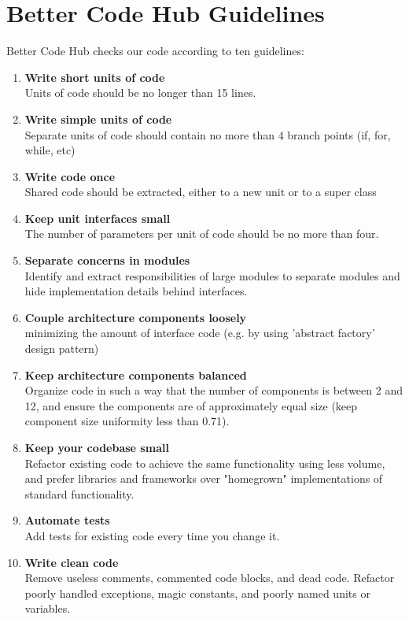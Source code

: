 \section{Better Code Hub Guidelines}\label{bch_guidelines}

Better Code Hub \cite{better_code_hub} checks our code according to ten guidelines:
\begin{enumerate}
    \item \textbf {Write short units of code} \\
    Units of code should be no longer than 15 lines.
    \item \textbf {Write simple units of code} \\
    Separate units of code should contain no more than 4 branch points (if, for, while, etc)
    \item \textbf{Write code once} \\
    Shared code should be extracted, either to a new unit or to a super class
    \item \textbf{Keep unit interfaces small} \\
    The number of parameters per unit of code should be no more than four.
    \item \textbf{Separate concerns in modules} \\
    Identify and extract responsibilities of large modules to separate modules and hide implementation details behind interfaces.
    \item \textbf{Couple architecture components loosely} \\
    minimizing the amount of interface code (e.g. by using 'abstract factory' design pattern)
    \item \textbf{Keep architecture components balanced} \\
    Organize code in such a way that the number of components is between 2 and 12, and ensure the components are of approximately equal size (keep component size uniformity less than 0.71).
    \item \textbf{Keep your codebase small} \\
    Refactor existing code to achieve the same functionality using less volume, and prefer libraries and frameworks over "homegrown" implementations of standard functionality.
    \item \textbf{Automate tests} \\
    Add tests for existing code every time you change it.
    \item \textbf{Write clean code}\\
    Remove useless comments, commented code blocks, and dead code. Refactor poorly handled exceptions, magic constants, and poorly named units or variables.  
\end{enumerate}